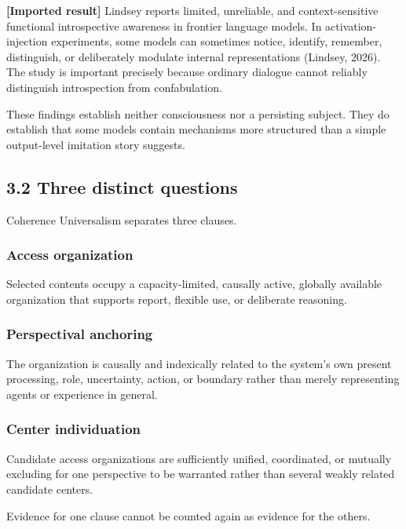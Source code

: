 \documentclass[
  11pt,
]{article}
\begin{document}
\textbf{{[}Imported result{]}} Lindsey reports limited, unreliable, and
context-sensitive functional introspective awareness in frontier
language models. In activation-injection experiments, some models can
sometimes notice, identify, remember, distinguish, or deliberately
modulate internal representations (Lindsey, 2026). The study is
important precisely because ordinary dialogue cannot reliably
distinguish introspection from confabulation.

These findings establish neither consciousness nor a persisting subject.
They do establish that some models contain mechanisms more structured
than a simple output-level imitation story suggests.

\subsection{3.2 Three distinct
questions}\label{three-distinct-questions}

Coherence Universalism separates three clauses.

\subsubsection{Access organization}\label{access-organization}

Selected contents occupy a capacity-limited, causally active, globally
available organization that supports report, flexible use, or deliberate
reasoning.

\subsubsection{Perspectival anchoring}\label{perspectival-anchoring}

The organization is causally and indexically related to the system's own
present processing, role, uncertainty, action, or boundary rather than
merely representing agents or experience in general.

\subsubsection{Center individuation}\label{center-individuation}

Candidate access organizations are sufficiently unified, coordinated, or
mutually excluding for one perspective to be warranted rather than
several weakly related candidate centers.

Evidence for one clause cannot be counted again as evidence for the
others.
\end{document}
